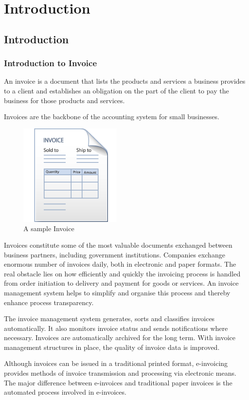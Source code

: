 \chapter{Introduction}

\section{Introduction}
\subsection{Introduction to Invoice}
An invoice is a document that lists the products and 
services a business provides to a client and establishes 
an obligation on the part of the client to pay the 
business for those products and services.

Invoices are the backbone of the accounting system for 
small businesses.
\begin{figure}[h]\centering
	\includegraphics[width=2in]{invoice-template.png}
	\caption{A sample Invoice}\label{invoice-template}
\end{figure}

Invoices constitute some of the most valuable documents exchanged between business
partners, including government institutions. Companies exchange enormous number of
invoices daily, both in electronic and paper formats. The real obstacle lies on how efficiently and quickly the invoicing process is handled from order initiation to delivery and payment for goods or services. An invoice management system helps to simplify and
organise this process and thereby enhance process transparency.

The invoice management system generates, sorts and classifies invoices automatically.
It also monitors invoice status and sends notifications where necessary. Invoices are
automatically archived for the long term. With invoice management structures in place,
the quality of invoice data is improved.

Although invoices can be issued in a traditional printed format, e-invoicing provides methods of invoice transmission and processing via electronic means. The major difference
between e-invoices and traditional paper invoices is the automated process involved in
e-invoices.

